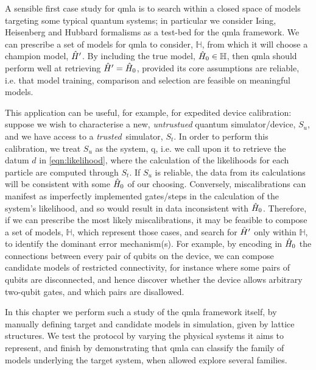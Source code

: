 
A sensible first case study for \gls{qmla} is to search within a closed space of models
targeting some typical quantum systems; 
in particular we consider Ising, Heisenberg and Hubbard formalisms as a test-bed for the \gls{qmla} framework. 
We can prescribe a set of models for \gls{qmla} to consider, $\mathbb{H}$,
from which it will choose a \gls{champion model}, $\hat{H}^{\prime}$.
By including the \gls{true model}, $\hat{H}_0 \in \mathbb{H}$, 
then \gls{qmla} should perform well at retrieving $\hat{H}^{\prime}=\hat{H}_0$,
provided its core assumptions are reliable, 
i.e. that model training, comparison and selection are 
feasible on meaningful models.
\par 

This application can be useful, for example, for expedited device calibration:
suppose we wish to characterise a new, \emph{untrustued} quantum simulator/device, $S_u$, 
and we have access to a \emph{trusted}\footnotemark \  simulator, $S_t$. 
In order to perform this calibration, 
we treat $S_u$ as the system, \gls{q}, i.e. we call upon it to retrieve the datum $d$ in \cref{eqn:likelihood}, 
where the calculation of the \glspl{likelihood}  for each \gls{particle} are computed through $S_t$. 
If $S_u$ is reliable, the data from its calculations will be consistent with some $\hat{H}_0$ of our choosing. 
Conversely, miscalibrations can manifest as imperfectly implemented gates/steps in the calculation of the system's \gls{likelihood}, 
and so would result in data inconsistent with $\hat{H}_0$. 
Therefore, if we can prescribe the most likely miscalibrations, it may be feasible to compose a set 
of models, $\mathbb{H}$, which represent those cases, and search for $\hat{H}^{\prime}$ only within $\mathbb{H}$,
to identify the dominant error mechanism(s). 
For example, by encoding in $\hat{H}_0$ the connections between every pair of qubits on the device,
we can compose candidate models of restricted connectivity, for instance where some pairs of qubits are disconnected, 
and hence discover whether the device allows arbitrary two-qubit gates, 
and which pairs are disallowed. 
\par

In this chapter we perform such a study of the \gls{qmla} framework itself, 
by manually defining target and candidate models in simulation, 
given by lattice structures.
We test the protocol by varying the physical systems it aims to represent, 
and finish by demonstrating that \gls{qmla} can classify the family of models 
underlying the target system, when allowed explore several families.  

